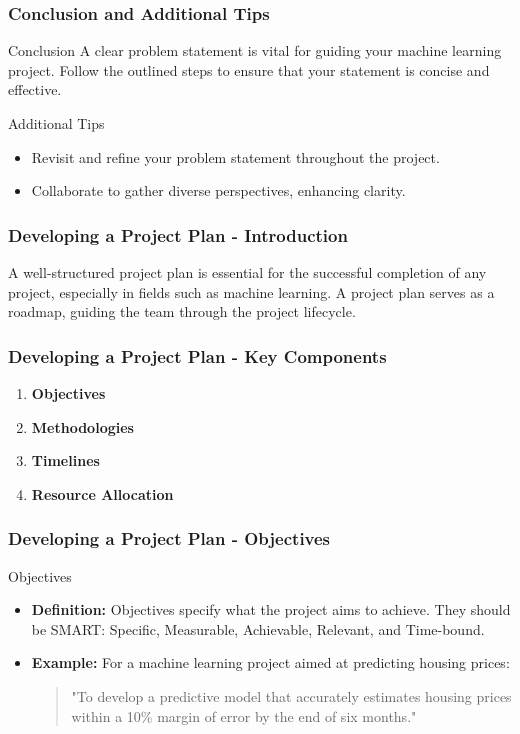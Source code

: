 \documentclass[aspectratio=169]{beamer}
\begin{document}
\begin{frame}[fragile]
    \frametitle{Conclusion and Additional Tips}
    \begin{block}{Conclusion}
        A clear problem statement is vital for guiding your machine learning project. Follow the outlined steps to ensure that your statement is concise and effective.
    \end{block}
    
    \begin{block}{Additional Tips}
        \begin{itemize}
            \item Revisit and refine your problem statement throughout the project.
            \item Collaborate to gather diverse perspectives, enhancing clarity.
        \end{itemize}
    \end{block}
\end{frame}

\begin{frame}[fragile]
    \frametitle{Developing a Project Plan - Introduction}
    A well-structured project plan is essential for the successful completion of any project, especially in fields such as machine learning. 
    A project plan serves as a roadmap, guiding the team through the project lifecycle.
\end{frame}

\begin{frame}[fragile]
    \frametitle{Developing a Project Plan - Key Components}
    \begin{enumerate}
        \item \textbf{Objectives}
        \item \textbf{Methodologies}
        \item \textbf{Timelines}
        \item \textbf{Resource Allocation}
    \end{enumerate}
\end{frame}

\begin{frame}[fragile]
    \frametitle{Developing a Project Plan - Objectives}
    \begin{block}{Objectives}
        \begin{itemize}
            \item \textbf{Definition:} Objectives specify what the project aims to achieve. 
            They should be SMART: Specific, Measurable, Achievable, Relevant, and Time-bound.
            \item \textbf{Example:} For a machine learning project aimed at predicting housing prices:
            \begin{quote}
                "To develop a predictive model that accurately estimates housing prices within a 10\% margin of error by the end of six months."
            \end{quote}
        \end{itemize}
    \end{block}
\end{frame}
\end{document}
